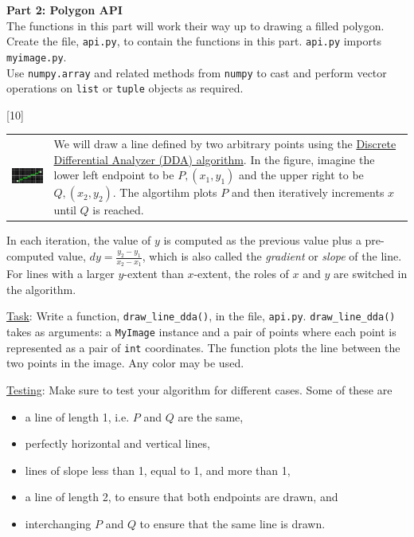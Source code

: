 \documentclass[addpoints]{exam}
\begin{document}
\begin{questions}
\begin{EnvFullwidth}
  {\Large\bf Part 2: Polygon API}\\

  The functions in this part will work their way up to drawing a filled polygon.\\ Create the file, \texttt{api.py}, to contain the functions in this part. \texttt{api.py} imports \texttt{myimage.py}.\\Use \texttt{numpy.array} and related methods from \texttt{numpy} to cast and perform vector operations on \texttt{list} or \texttt{tuple} objects as required.
\end{EnvFullwidth}

  [10]

  \noindent\begin{tabularx}{\linewidth}{lX}
    \includegraphics[align=t]{dda} &
    We will draw a line defined by two arbitrary points using the \href{https://en.wikipedia.org/wiki/Digital_differential_analyzer_(graphics_algorithm)}{Discrete Differential Analyzer (DDA) algorithm}. In the figure, imagine the lower left endpoint to be $P, (x_1,y_1)$ and the upper right to be $Q, (x_2,y_2)$. The algortihm plots $P$ and then iteratively increments $x$ until $Q$ is reached.
  \end{tabularx}
  In each iteration, the value of $y$ is computed as the previous value plus a pre-computed value, $dy = \frac{y_2-y_1}{x_2-x_1}$, which is also called the \textit{gradient} or \textit{slope} of the line. For lines with a larger $y$-extent than $x$-extent, the roles of $x$ and $y$ are switched in the algorithm.
  
  \underline{Task}: Write a function, \texttt{draw\_line\_dda()}, in the file, \texttt{api.py}. \texttt{draw\_line\_dda()} takes as arguments: a \texttt{MyImage} instance and a pair of points where each point is represented as a pair of \texttt{int} coordinates. The function plots the line between the two points in the image. Any color may be used.

  \underline{Testing}: Make sure to test your algorithm for different cases. Some of these are
  \begin{itemize}
  \item a line of length 1, i.e. $P$ and $Q$ are the same,
  \item perfectly horizontal and vertical lines,
  \item lines of slope less than 1, equal to 1, and more than 1,
  \item a line of length 2, to ensure that both endpoints are drawn, and
  \item interchanging $P$ and $Q$ to ensure that the same line is drawn.
  \end{itemize}


\end{questions}
\end{document}
